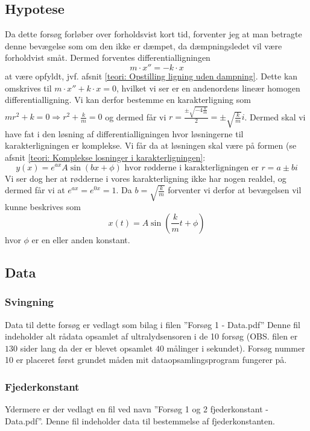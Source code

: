 \subsection{Hypotese}\label{exp1: Hypotese}
Da dette forsøg forløber over forholdsvist kort tid, forventer jeg at man betragte denne bevægelse som om den ikke er dæmpet, da dæmpningsledet vil være forholdvist småt. 
Dermed forventes differentialligningen 
$$m\cdot x'' = -k \cdot x$$
at være opfyldt, jvf. afsnit \ref{teori: Opstilling ligning uden dampning}.
Dette kan omskrives til $m\cdot x'' + k\cdot x=0$, hvilket vi ser er en andenordens lineær homogen differentialligning. 
Vi kan derfor bestemme en karakterligning som $mr^2 + k = 0 \Rightarrow r^2 + \frac{k}{m} = 0$ og dermed får vi $r = \frac{\pm \sqrt{-4\frac{k}{m}}}{2}=\pm\sqrt{\frac{k}{m}}i$.
Dermed skal vi have fat i den løsning af differentialligningen hvor løsningerne til karakterligningen er komplekse. 
Vi får da at løsningen skal være på formen (se afsnit \ref{teori: Komplekse losninger i karakterligningen}:
$$y(x) = e^{ax}A\sin(bx+\phi) \text{ hvor rødderne i karakterligningen er } r = a \pm bi$$
Vi ser dog her at rødderne i vores karakterligning ikke har nogen realdel, og dermed får vi at $e^{ax}=e^{0x}=1$.
Da $b=\sqrt{\frac{k}{m}}$ forventer vi derfor at bevægelsen vil kunne beskrives som 
$$x(t)=A\sin (\frac{k}{m}t+\phi)$$
hvor $\phi$ er en eller anden konstant. 


\subsection{Data}\label{exp1: Data}
\subsubsection{Svingning}
Data til dette forsøg er vedlagt som bilag i filen ''Forsøg 1 - Data.pdf''
Denne fil indeholder alt rådata opsamlet af ultralydsensoren i de 10 forsøg (OBS. filen er $130$ sider lang da der er blevet opsamlet $40$ målinger i sekundet). 
Forsøg nummer 10 er placeret først grundet måden mit dataopsamlingsprogram fungerer på.

\subsubsection{Fjederkonstant}\label{exp1: Fjederkonstant}
Ydermere er der vedlagt en fil ved navn ''Forsøg 1 og 2 fjederkonstant - Data.pdf''.
Denne fil indeholder data til bestemmelse af fjederkonstanten. 

